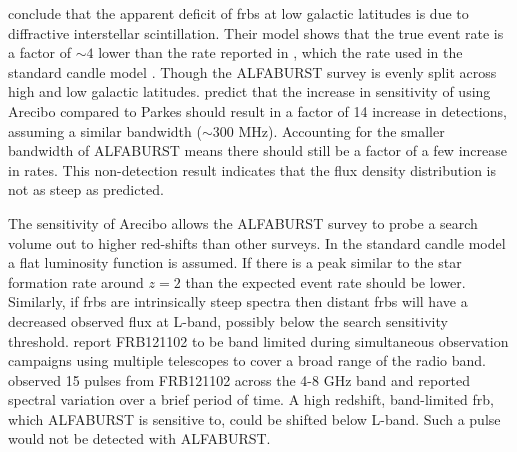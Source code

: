 \documentclass[a4paper,fleqn,usenatbib]{mnras}
\begin{document}
\cite{2015MNRAS.451.3278M} conclude that the apparent deficit of \glspl{frb} at
low galactic latitudes is due to diffractive interstellar scintillation. Their
model shows that the true event rate is a factor of $\sim 4$ lower than the rate
reported in \cite{2013Sci...341...53T}, which the rate used in the standard
candle model \citep{2013MNRAS.436L...5L}. Though the ALFABURST survey is evenly
split across high and low galactic latitudes.  \cite{2015MNRAS.451.3278M} predict
that the increase in sensitivity of using Arecibo compared to Parkes should
result in a factor of 14 increase in detections, assuming a similar bandwidth
($\sim 300$ MHz). Accounting for the smaller bandwidth of ALFABURST means there
should still be a factor of a few increase in rates. This non-detection result
indicates that the \cite{2015MNRAS.451.3278M} flux density distribution is not
as steep as predicted.

The sensitivity of Arecibo allows the ALFABURST survey to probe a search volume
out to higher red-shifts than other surveys. In the standard candle model a flat
luminosity function is assumed. If there is a peak similar to the star formation
rate around $z=2$ \citep{2014ARA&A..52..415M} than the expected event rate
should be lower. Similarly, if \glspl{frb} are intrinsically steep spectra then
distant \glspl{frb} will have a decreased observed flux at L-band, possibly
below the search sensitivity threshold. \cite{2017arXiv170507553L} report
FRB121102 to be band limited during simultaneous observation campaigns using
multiple telescopes to cover a broad range of the radio band. \cite{atel10675}
observed 15 pulses from FRB121102 across the 4-8 GHz band and reported spectral
variation over a brief period of time. A high redshift, band-limited \gls{frb},
which ALFABURST is sensitive to, could be shifted below L-band. Such a pulse
would not be detected with ALFABURST.

\end{document}
